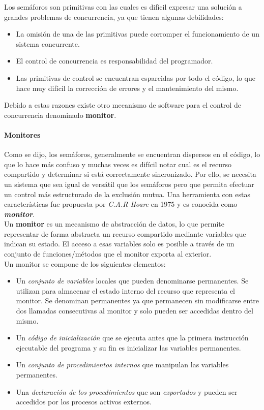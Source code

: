 Los semáforos son primitivas con las cuales es difícil expresar una solución a grandes problemas de concurrencia, ya que tienen algunas debilidades:
\begin{itemize}
    \item La omisión de una de las primitivas puede corromper el funcionamiento de un sistema concurrente.
    \item El control de concurrencia es responsabilidad del programador.
    \item Las primitivas de control se encuentran esparcidas por todo el código, lo que hace muy difícil la corrección de errores y el mantenimiento del mismo.
\end{itemize}

Debido a estas razones existe otro mecanismo de software para el control de concurrencia denominado \textbf{monitor}.

\paragraph{Monitores}
Como se dijo, los semáforos, generalmente se encuentran dispersos en el código, lo que lo hace más confuso y muchas veces es difícil notar cual es el recurso compartido y determinar si está correctamente sincronizado. Por ello, se necesita un sistema que sea igual de versátil que los semáforos pero que permita efectuar un control más estructurado de la exclusión mutua. Una herramienta con estas características fue propuesta por \textit{C.A.R Hoare} en 1975 y es conocida como \textbf{\textit{monitor}}.\\
Un \textbf{monitor} es un mecanismo de abstracción de datos, lo que permite representar de forma abstracta un recurso compartido mediante variables que indican su estado. El acceso a esas variables solo es posible a través de un conjunto de funciones/métodos que el monitor exporta al exterior.\\

Un monitor se compone de los siguientes elementos:
\begin{itemize}
    \item Un \textit{conjunto de variables} locales que pueden denominarse permanentes. Se utilizan para almacenar el estado interno del recurso que representa el monitor. Se denominan permanentes ya que permanecen sin modificarse entre dos llamadas consecutivas al monitor y solo pueden ser accedidas dentro del mismo.
    
    \item Un \textit{código de inicialización} que se ejecuta antes que la primera instrucción ejecutable del programa y su fin es inicializar las variables permanentes. 

    \item Un \textit{conjunto de procedimientos internos} que manipulan las variables permanentes.
    
    \item Una \textit{declaración de los procedimientos} que son \textit{exportados} y pueden ser accedidos por los procesos activos externos.
\end{itemize}

